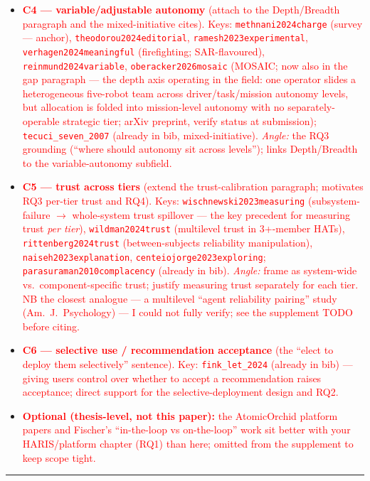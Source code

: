 \documentclass[10pt]{article}
\theoremstyle{definition}
\begin{document}
\begin{itemize}
  \item \textcolor{red}{\textbf{C4 --- variable/adjustable autonomy} (attach to the Depth/Breadth paragraph and the mixed-initiative cites). Keys: \texttt{methnani2024charge} (survey --- anchor), \texttt{theodorou2024editorial}, \texttt{ramesh2023experimental}, \texttt{verhagen2024meaningful} (firefighting; SAR-flavoured), \texttt{reinmund2024variable}, \texttt{oberacker2026mosaic} (MOSAIC; now also in the gap paragraph --- the depth axis operating in the field: one operator slides a heterogeneous five-robot team across driver/task/mission autonomy levels, but allocation is folded into mission-level autonomy with no separately-operable strategic tier; arXiv preprint, verify status at submission); \texttt{tecuci\_seven\_2007} (already in bib, mixed-initiative). \emph{Angle:} the RQ3 grounding (``where should autonomy sit across levels''); links Depth/Breadth to the variable-autonomy subfield.}
  \item \textcolor{red}{\textbf{C5 --- trust across tiers} (extend the trust-calibration paragraph; motivates RQ3 per-tier trust and RQ4). Keys: \texttt{wischnewski2023measuring} (subsystem-failure $\to$ whole-system trust spillover --- the key precedent for measuring trust \emph{per tier}), \texttt{wildman2024trust} (multilevel trust in 3+-member HATs), \texttt{rittenberg2024trust} (between-subjects reliability manipulation), \texttt{naiseh2023explanation}, \texttt{centeiojorge2023exploring}; \texttt{parasuraman2010complacency} (already in bib). \emph{Angle:} frame as system-wide vs.\ component-specific trust; justify measuring trust separately for each tier. NB the closest analogue --- a multilevel ``agent reliability pairing'' study (Am.\ J.\ Psychology) --- I could not fully verify; see the supplement TODO before citing.}
  \item \textcolor{red}{\textbf{C6 --- selective use / recommendation acceptance} (the ``elect to deploy them selectively'' sentence). Key: \texttt{fink\_let\_2024} (already in bib) --- giving users control over whether to accept a recommendation raises acceptance; direct support for the selective-deployment design and RQ2.}
  \item \textcolor{red}{\textbf{Optional (thesis-level, not this paper):} the AtomicOrchid platform papers and Fischer's ``in-the-loop vs on-the-loop'' work sit better with your HARIS/platform chapter (RQ1) than here; omitted from the supplement to keep scope tight.}
\end{itemize}
\textcolor{red}{\rule{\linewidth}{0.6pt}}
\end{document}
